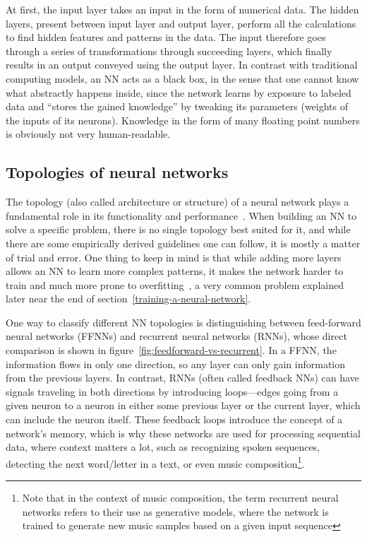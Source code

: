 At first, the input layer takes an input in the form of numerical data.
The hidden layers, present between input layer and output layer,
perform all the calculations to find hidden features and patterns in the data.
The input therefore goes through a series of transformations through succeeding layers,
which finally results in an output conveyed using the output layer.
In contrast with traditional computing models,
an NN acts as a black box, in the sense
that one cannot know what abstractly happens inside, since the network
learns by exposure to labeled data and ``stores the gained knowledge''
by tweaking its parameters (weights of the inputs of its neurons).
Knowledge in the form of many floating point numbers is obviously not very human-readable.


\subsection*{Topologies of neural networks}
\label{topologies-of-neural-networks}
The topology (also called architecture or structure)
of a neural network plays a fundamental role in its functionality and performance~\cite{fiesler1996topologies}.
When building an NN to solve a specific problem, there is no single topology best suited for it,
and while there are some empirically derived guidelines one can follow, it is mostly a matter of trial and error.
One thing to keep in mind is that while adding more layers allows an NN to learn more complex patterns,
it makes the network harder to train and much more prone to overfitting~\cite[p. 104]{Deep-learning-with-Python},
a very common problem explained later near the end of section~\ref{training-a-neural-network}.

One way to classify different NN topologies is distinguishing between
feed-forward neural networks (FFNNs) and recurrent neural networks (RNNs),
whose direct comparison is shown in figure~\ref{fig:feedforward-vs-recurrent}.
In a FFNN, the information flows in only one direction,
so any layer can only gain information from the previous layers.
In contrast, RNNs (often called feedback NNs) can have
signals traveling in both directions by introducing loops---edges
going from a given neuron to a neuron in either some previous layer or the current layer,
which can include the neuron itself. These feedback loops introduce the concept
of a network's memory, which is why these networks are used for processing
sequential data, where context matters a lot, such as recognizing spoken sequences,
detecting the next word/letter in a text, or even music
composition\footnote{Note that in the context of music composition, the term recurrent neural networks
refers to their use as generative models, where the network is trained to generate new music samples
based on a given input sequence}.

